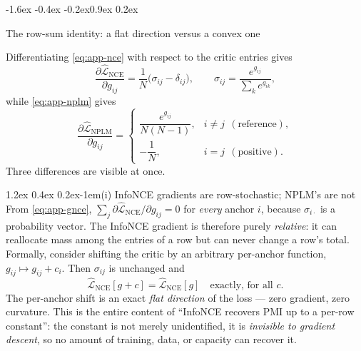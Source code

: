 \documentclass{article}
\makeatletter
\renewcommand\subsection{\@startsection{subsection}{2}{\z@}%
  {-1.6ex \@plus -0.4ex \@minus -0.2ex}{0.9ex \@plus 0.2ex}%
  {\normalsize\bf\raggedright}}
\renewcommand\paragraph{\@startsection{paragraph}{4}{\z@}%
  {1.2ex \@plus 0.4ex \@minus 0.2ex}{-1em}{\normalsize\bf}}
\makeatother
\begin{document}
\subsection{The row-sum identity: a flat direction versus a convex one}
\label{app:rowsum}

Differentiating \eqref{eq:app-nce} with respect to the critic entries gives
\begin{equation}
\frac{\partial \widehat{\mathcal{L}}_{\mathrm{NCE}}}{\partial g_{ij}}
= \frac1N\big(\sigma_{ij} - \delta_{ij}\big),
\qquad
\sigma_{ij} = \frac{e^{g_{ij}}}{\sum_k e^{g_{ik}}},
\label{eq:app-gnce}
\end{equation}
while \eqref{eq:app-nplm} gives
\begin{equation}
\frac{\partial \widehat{\mathcal{L}}_{\mathrm{NPLM}}}{\partial g_{ij}}
=
\begin{cases}
\dfrac{e^{g_{ij}}}{N(N-1)}, & i\neq j\ \ (\text{reference}),\\[6pt]
-\dfrac1N, & i=j\ \ (\text{positive}).
\end{cases}
\label{eq:app-gnplm}
\end{equation}
Three differences are visible at once.

\paragraph{(i) InfoNCE gradients are row-stochastic; NPLM's are not}
From \eqref{eq:app-gnce}, $\sum_j \partial\widehat{\mathcal{L}}_{\mathrm{NCE}}
/\partial g_{ij} = 0$ for \emph{every} anchor $i$, because $\sigma_{i\cdot}$ is
a probability vector. The InfoNCE gradient is therefore purely
\emph{relative}: it can reallocate mass among the entries of a row but can
never change a row's total. Formally, consider shifting the critic by an
arbitrary per-anchor function, $g_{ij}\mapsto g_{ij}+c_i$. Then
$\sigma_{ij}$ is unchanged and
\begin{equation}
\widehat{\mathcal{L}}_{\mathrm{NCE}}[g+c] = \widehat{\mathcal{L}}_{\mathrm{NCE}}[g]
\quad\text{exactly, for all } c .
\end{equation}
The per-anchor shift is an exact \emph{flat direction} of the loss --- zero
gradient, zero curvature. This is the entire content of ``InfoNCE recovers PMI
up to a per-row constant'': the constant is not merely unidentified, it is
\emph{invisible to gradient descent}, so no amount of training, data, or
capacity can recover it.
\end{document}
